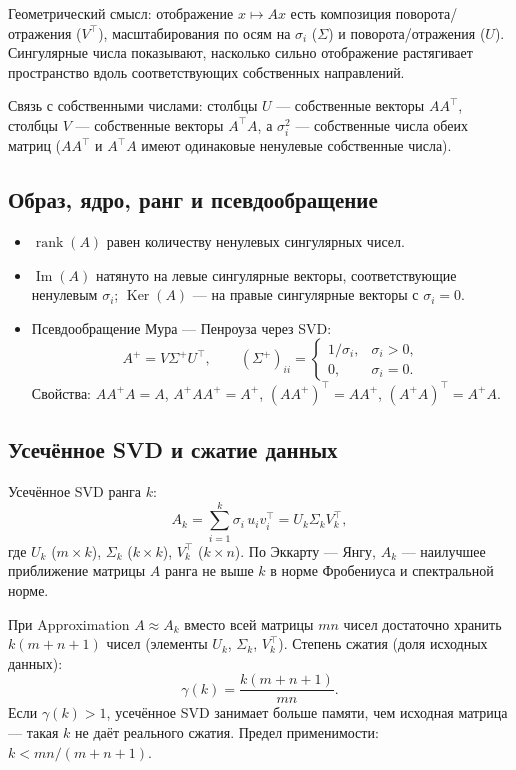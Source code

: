 \documentclass[12pt,a4paper]{article}
\DeclareMathOperator{\rank}{rank}
\begin{document}
Геометрический смысл: отображение $x\mapsto Ax$ есть композиция поворота/отражения
($V^\top$), масштабирования по осям на $\sigma_i$ ($\Sigma$) и поворота/отражения ($U$).
Сингулярные числа показывают, насколько сильно отображение растягивает пространство
вдоль соответствующих собственных направлений.

Связь с собственными числами: столбцы $U$ — собственные векторы $AA^\top$, столбцы $V$ —
собственные векторы $A^\top A$, а $\sigma_i^2$ — собственные числа обеих матриц
($AA^\top$ и $A^\top A$ имеют одинаковые ненулевые собственные числа).

\subsection{Образ, ядро, ранг и псевдообращение}
\begin{itemize}
    \item $\rank(A)$ равен количеству ненулевых сингулярных чисел.
    \item $\operatorname{Im}(A)$ натянуто на левые сингулярные векторы, соответствующие
    ненулевым $\sigma_i$; $\operatorname{Ker}(A)$ — на правые сингулярные векторы
    с $\sigma_i=0$.
    \item Псевдообращение Мура — Пенроуза через SVD:
    \[
        A^+ = V\Sigma^+U^\top,\qquad
        (\Sigma^+)_{ii} = \begin{cases}1/\sigma_i,&\sigma_i>0,\\0,&\sigma_i=0.\end{cases}
    \]
    Свойства: $AA^+A=A$, $A^+AA^+=A^+$, $(AA^+)^\top=AA^+$, $(A^+A)^\top=A^+A$.
\end{itemize}

\subsection{Усечённое SVD и сжатие данных}
Усечённое SVD ранга $k$:
\[
    A_k = \sum_{i=1}^{k}\sigma_i\,u_i v_i^\top = U_k\Sigma_k V_k^\top,
\]
где $U_k$ ($m\times k$), $\Sigma_k$ ($k\times k$), $V_k^\top$ ($k\times n$).
По Эккарту — Янгу, $A_k$ — наилучшее приближение матрицы $A$ ранга не выше $k$ в норме
Фробениуса и спектральной норме.

При Approximation $A\approx A_k$ вместо всей матрицы $mn$ чисел достаточно хранить
$k(m+n+1)$ чисел (элементы $U_k$, $\Sigma_k$, $V_k^\top$). Степень сжатия (доля
исходных данных):
\[
    \gamma(k) = \frac{k(m+n+1)}{mn}.
\]
Если $\gamma(k)>1$, усечённое SVD занимает больше памяти, чем исходная матрица — такая
$k$ не даёт реального сжатия. Предел применимости: $k < mn/(m+n+1)$.
\end{document}
